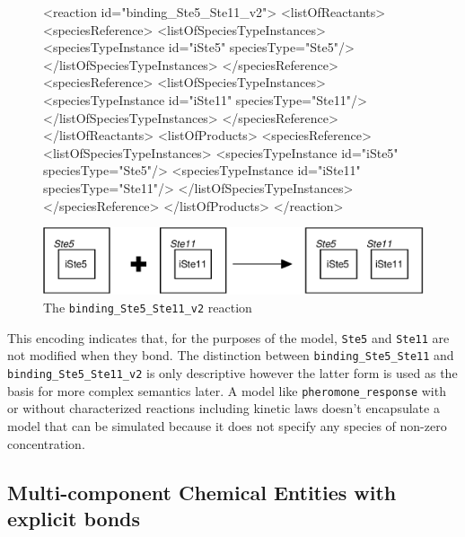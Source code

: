 \documentclass{cekarticle}
\begin{document}
\begin{figure}[h]
\begin{example}
<reaction id="binding_Ste5_Ste11_v2">
    <listOfReactants>
        <speciesReference>
            <listOfSpeciesTypeInstances>
                <speciesTypeInstance id="iSte5" speciesType="Ste5"/>
            </listOfSpeciesTypeInstances>
        </speciesReference>
        <speciesReference>
            <listOfSpeciesTypeInstances>
                <speciesTypeInstance id="iSte11" speciesType="Ste11"/>
            </listOfSpeciesTypeInstances>
        </speciesReference>
    </listOfReactants>
    <listOfProducts>
        <speciesReference>
            <listOfSpeciesTypeInstances>
                <speciesTypeInstance id="iSte5" speciesType="Ste5"/>
                <speciesTypeInstance id="iSte11" speciesType="Ste11"/>
            </listOfSpeciesTypeInstances>
        </speciesReference>
    </listOfProducts>
</reaction>
\end{example}
  \vspace*{8pt}
  \centering
  \includegraphics[scale = 0.7]{binding_Ste5_Ste11_v2.eps}
  \caption{The \texttt{binding\_Ste5\_Ste11\_v2} reaction}
  \label{fig:binding_Ste5_Ste11_v2}
\end{figure}

This encoding indicates that, for the purposes of the model,
\texttt{Ste5} and \texttt{Ste11} are not modified when they bond.
The distinction between \texttt{binding\_Ste5\_Ste11} and
\texttt{binding\_Ste5\_Ste11\_v2} is only descriptive however the
latter form is used as the basis for more complex semantics later.
A model like \texttt{pheromone\_response} with or without
characterized reactions including kinetic laws doesn't encapsulate
a model that can be simulated because it does not specify any
species of non-zero concentration.

\subsection{Multi-component Chemical Entities with explicit bonds}
\label{sec:explicitbonds}
\end{document}
